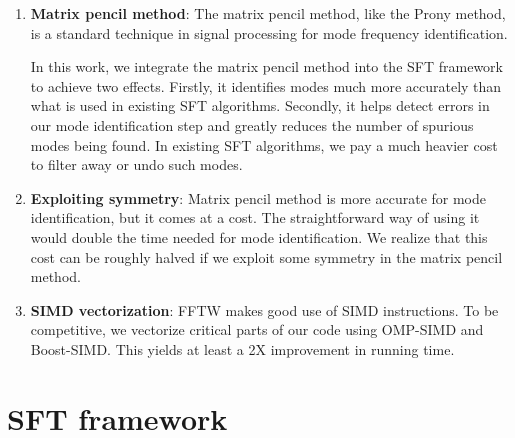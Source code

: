 \documentclass[10pt]{article}
\begin{document}
\begin{enumerate}
\item \textbf{Matrix pencil method}: The matrix pencil method, like the Prony method, is a standard technique in signal processing for mode frequency identification.

In this work, we integrate the matrix pencil method into the SFT framework to achieve two effects. Firstly, it identifies modes much more accurately than what is used in existing SFT algorithms. Secondly, it helps detect errors in our mode identification step and greatly reduces the number of spurious modes being found. In existing SFT algorithms, we pay a much heavier cost to filter away or undo such modes.

\item \textbf{Exploiting symmetry}: Matrix pencil method is more accurate for mode identification, but it comes at a cost. The straightforward way of using it would double the time needed for mode identification. We realize that this cost can be roughly halved if we exploit some symmetry in the matrix pencil method.

\item \textbf{SIMD vectorization}: FFTW makes good use of SIMD instructions. To be competitive, we vectorize critical parts of our code using OMP-SIMD and Boost-SIMD. This yields at least a 2X improvement in running time.

\end{enumerate}

\section{SFT framework}
\end{document}
